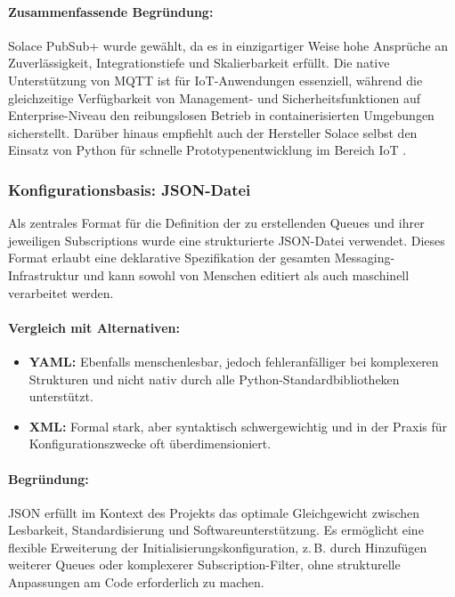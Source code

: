 \paragraph*{Zusammenfassende Begr\"undung:}

Solace PubSub+ wurde gew\"ahlt, da es in einzigartiger Weise hohe Anspr\"uche an Zuverl\"assigkeit, Integrationstiefe und Skalierbarkeit erf\"ullt. Die native Unterst\"utzung von MQTT ist f\"ur IoT-Anwendungen essenziell, w\"ahrend die gleichzeitige Verf\"ugbarkeit von Management- und Sicherheitsfunktionen auf Enterprise-Niveau den reibungslosen Betrieb in containerisierten Umgebungen sicherstellt. Dar\"uber hinaus empfiehlt auch der Hersteller Solace selbst den Einsatz von Python f\"ur schnelle Prototypenentwicklung im Bereich IoT \cite{solace_python_doc}.

\subsubsection*{Konfigurationsbasis: JSON-Datei}

Als zentrales Format f\"ur die Definition der zu erstellenden Queues und ihrer jeweiligen Subscriptions wurde eine strukturierte JSON-Datei verwendet. Dieses Format erlaubt eine deklarative Spezifikation der gesamten Messaging-Infrastruktur und kann sowohl von Menschen editiert als auch maschinell verarbeitet werden.\cite{json_best_practices}

\paragraph*{Vergleich mit Alternativen:}

\begin{itemize}
  \item \textbf{YAML:} Ebenfalls menschenlesbar, jedoch fehleranf\"alliger bei komplexeren Strukturen und nicht nativ durch alle Python-Standardbibliotheken unterst\"utzt.
  \item \textbf{XML:} Formal stark, aber syntaktisch schwergewichtig und in der Praxis f\"ur Konfigurationszwecke oft \"uberdimensioniert.
\end{itemize}

\paragraph*{Begr\"undung:}

JSON erf\"ullt im Kontext des Projekts das optimale Gleichgewicht zwischen Lesbarkeit, Standardisierung und Softwareunterst\"utzung. Es erm\"oglicht eine flexible Erweiterung der Initialisierungskonfiguration, z.\,B. durch Hinzuf\"ugen weiterer Queues oder komplexerer Subscription-Filter, ohne strukturelle Anpassungen am Code erforderlich zu machen.

